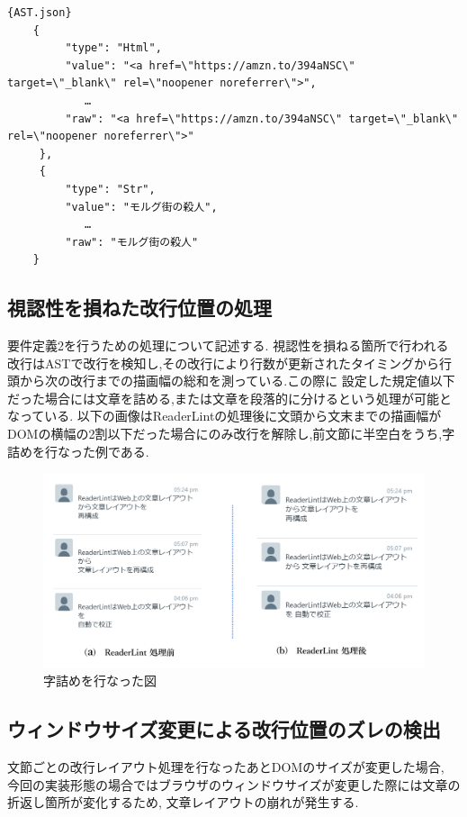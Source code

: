 
\begin{lstlisting}{AST.json}
    {
         "type": "Html",
         "value": "<a href=\"https://amzn.to/394aNSC\" target=\"_blank\" rel=\"noopener noreferrer\">",
            …
         "raw": "<a href=\"https://amzn.to/394aNSC\" target=\"_blank\" rel=\"noopener noreferrer\">"
     },
     {
         "type": "Str",
         "value": "モルグ街の殺人",
            …
         "raw": "モルグ街の殺人"
    }
\end{lstlisting}

\subsection{視認性を損ねた改行位置の処理}
要件定義2を行うための処理について記述する.
視認性を損ねる箇所で行われる改行はASTで改行を検知し,その改行により行数が更新されたタイミングから行頭から次の改行までの描画幅の総和を測っている.この際に
設定した規定値以下だった場合には文章を詰める,または文章を段落的に分けるという処理が可能となっている.
以下の画像はReaderLintの処理後に文頭から文末までの描画幅がDOMの横幅の2割以下だった場合にのみ改行を解除し,前文節に半空白をうち,字詰めを行なった例である.

\begin{figure}[H]
    \centering
    \label{fig:jutsume}
    \includegraphics[width=0.7\columnwidth]{image/03/img10.png}
	\caption[字詰めを行なった図]{字詰めを行なった図}
\end{figure}

\subsection{ウィンドウサイズ変更による改行位置のズレの検出}
文節ごとの改行レイアウト処理を行なったあとDOMのサイズが変更した場合,
今回の実装形態の場合ではブラウザのウィンドウサイズが変更した際には文章の折返し箇所が変化するため,
文章レイアウトの崩れが発生する.

